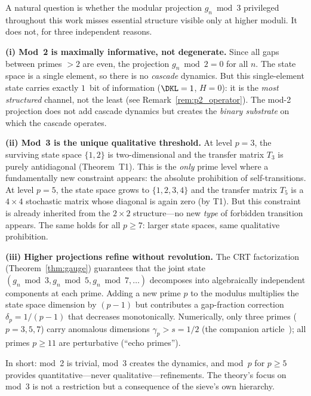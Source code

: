 \documentclass[12pt,a4paper]{article}
\begin{document}
\begin{remark}
\label{rem:why_mod3}
A natural question is whether the modular projection $g_n \bmod 3$
privileged throughout this work misses essential structure visible
only at higher moduli. It does not, for three independent reasons.

\textbf{(i) Mod~2 is maximally informative, not degenerate.}
Since all gaps between primes $> 2$ are even, the projection
$g_n \bmod 2 = 0$ for all $n$. The state space is a single element,
so there is no \emph{cascade} dynamics. But this single-element state
carries exactly $1$~bit of information ($\DKL = 1$, $H = 0$):
it is the \emph{most structured} channel, not the least
(see Remark~\ref{rem:p2_operator}).
The mod-2 projection does not add cascade dynamics but creates the
\emph{binary substrate} on which the cascade operates.

\textbf{(ii) Mod~3 is the unique qualitative threshold.}
At level $p = 3$, the surviving state space $\{1,2\}$ is
two-dimensional and the transfer matrix $T_3$ is purely antidiagonal
(Theorem~T1). This is the \emph{only} prime level where a fundamentally
new constraint appears: the absolute prohibition of self-transitions.
At level $p = 5$, the state space grows to $\{1,2,3,4\}$ and the
transfer matrix $T_5$ is a $4 \times 4$ stochastic matrix whose
diagonal is again zero (by T1). But this constraint is already
inherited from the $2 \times 2$ structure---no new \emph{type} of
forbidden transition appears. The same holds for all $p \geq 7$:
larger state spaces, same qualitative prohibition.

\textbf{(iii) Higher projections refine without revolution.}
The CRT factorization (Theorem~\ref{thm:gauge}) guarantees that
the joint state $(g_n \bmod 3, g_n \bmod 5, g_n \bmod 7, \ldots)$
decomposes into algebraically independent components at each prime.
Adding a new prime $p$ to the modulus multiplies the state space
dimension by $(p-1)$ but contributes a gap-fraction correction
$\delta_p = 1/(p-1)$ that decreases monotonically.
Numerically, only three primes ($p = 3, 5, 7$) carry anomalous
dimensions $\gamma_p > s = 1/2$ (the companion article~\cite{companion_M2}); all primes $p \geq 11$
are perturbative (``echo primes'').

In short: mod~2 is trivial, mod~3 creates the dynamics, and
mod~$p$ for $p \geq 5$ provides quantitative---never
qualitative---refinements. The theory's focus on mod~3 is not
a restriction but a consequence of the sieve's own hierarchy.
\end{remark}
\end{document}
